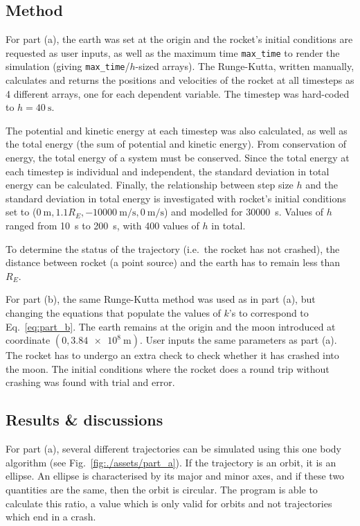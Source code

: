 \documentclass[hyphens,twocolumn,nobalancelastpage,aps,10pt,citeautoscript,longbibliography]{revtex4-2}
\begin{document}
\subsection{Method}%
\label{sub:method_1}

\noindent For part (a), the earth was set at the origin and the rocket's
initial conditions are requested as user inputs, as well as the maximum time
\lstinline{max_time} to render the simulation (giving
\lstinline{max_time}/$h$-sized arrays). The Runge-Kutta, written manually,
calculates and returns the positions and velocities of the rocket at all
timesteps as 4 different arrays, one for each dependent variable. The timestep
was hard-coded to $h=\qty{40}{\second}$.

The potential and kinetic energy at each timestep was also calculated, as well
as the total energy (the sum of potential and kinetic energy). From
conservation of energy, the total energy of a system must be conserved. Since
the total energy at each timestep is individual and independent, the standard
deviation in total energy can be calculated. Finally, the relationship between
step size $h$ and the standard deviation in total energy is investigated with
rocket's initial conditions set to ($\qty{0}{\metre}, 1.1 R_E,
	\qty{-10000}{\metre\per\second}, \qty{0}{\metre\per\second}$) and modelled for
\qty{30000}{\second}. Values of $h$ ranged from \qty{10}{\second} to
\qty{200}{\second}, with 400 values of $h$ in total.

To determine the status of the trajectory (i.e.\ the rocket has not crashed),
the distance between rocket (a point source) and the earth has to remain less
than $R_E$.

For part (b), the same Runge-Kutta method was used as in part (a), but changing
the equations that populate the values of $k$'s to correspond to
Eq.~\ref{eq:part_b}. The earth remains at the origin and the moon introduced at
coordinate $(0,\qty{3.84e8}{\metre})$. User inputs the same parameters as part (a). The rocket
has to undergo an extra check to check whether it has crashed into the moon.
The initial conditions where the rocket does a round trip without crashing was
found with trial and error.

\subsection{Results \& discussions}%
\label{sub:results_and_discussions_1}

\noindent For part (a), several different trajectories can be simulated using
this one body algorithm (see Fig.~\ref{fig:./assets/part_a}). If the trajectory
is an orbit, it is an ellipse. An ellipse is characterised by its major and
minor axes, and if these two quantities are the same, then the orbit is
circular. The program is able to calculate this ratio, a value which is only
valid for orbits and not trajectories which end in a crash.
\end{document}
